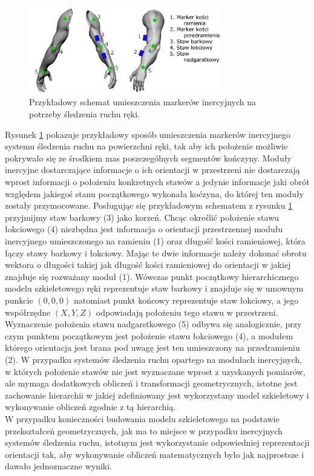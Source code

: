 	\begin{figure}[!htp]
		\centering	
		\includegraphics[width=0.75\textwidth]{images/imuArm.png}
		\caption{Przykładowy schemat umieszczenia markerów inercyjnych na potrzeby śledzenia ruchu ręki.}
		\label{fig:literature:imuMarkerPlacementSample}
	\end{figure}
		
	Rysunek \ref{fig:literature:imuMarkerPlacementSample} pokazuje przykładowy sposób umieszczenia markerów inercyjnego systemu śledzenia ruchu na powierzchni ręki, tak aby ich położenie możliwie pokrywało się ze środkiem mas poszczególnych segmentów kończyny. 
	Moduły inercyjne dostarczające informacje o ich orientacji w przestrzeni 
	nie dostarczają wprost informacji o położeniu konkretnych stawów a jedynie informacje jaki obrót względem jakiegoś stanu początkowego wykonała koćzyna, do której ten moduły zostały przymocowane. Posługując się przykładowym schematem z rysunku \ref{fig:literature:imuMarkerPlacementSample} przyjmijmy staw barkowy (3) jako korzeń. Chcąc określić położenie stawu łokciowego (4) niezbędna jest informacja o orientacji przestrzennej modułu inercyjnego umieszczonego na ramieniu (1) oraz długość kości ramieniowej, która łączy stawy barkowy i łokciowy. Mając te dwie informacje należy dokonać obrotu wektora o długości takiej jak długość kości ramieniowej do orientacji w jakiej znajduje się rozważany moduł (1). Wówczas punkt początkowy hierarchicznego modelu szkieletowego ręki
	reprezentuje staw barkowy i znajduje się w umownym punkcie $(0 , 0 , 0)$ natomiast punkt końcowy reprezentuje staw łokciowy, a jego współrzędne $(X , Y , Z)$ odpowiadają położeniu tego stawu w przestrzeni. Wyznaczenie położenia stawu nadgarstkowego (5) odbywa się analogicznie, przy czym punktem początkowym jest położenie stawu łokciowego (4), a modułem którego orientacja jest brana pod uwagę jest ten umieszczony na przedramieniu (2). W przypadku systemów śledzenia ruchu opartego na modułach inercyjnych, w których położenie stawów nie jest wyznaczane wprost z uzyskanych pomiarów, ale mymaga dodatkowych obliczeń i transformacji geometrycznych, istotne jest zachowanie hierarchii w jakiej zdefiniowany jest wykorzystany model szkieletowy i wykonywanie obliczeń zgodnie z tą hierarchią.\\
	W przypadku konieczności budowania modelu szkieletowego na podstawie przekształceń geometrycznych, jak ma to miejsce w przypadku inercyjnych systemów śledzenia ruchu, istotnym jest wykorzystanie odpowiedniej reprezentacji orientacji tak, aby wykonywanie obliczeń matematycznych było jak najprostsze i dawało jednoznaczne wyniki.
		
